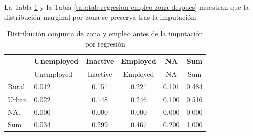 \documentclass[
  spanish,
  12pt,
]{book}
\newenvironment{Shaded}{\begin{snugshade}}{\end{snugshade}}
\newcommand{\AttributeTok}[1]{\textcolor[rgb]{0.13,0.29,0.53}{#1}}
\newcommand{\FunctionTok}[1]{\textcolor[rgb]{0.13,0.29,0.53}{\textbf{#1}}}
\newcommand{\NormalTok}[1]{#1}
\newcommand{\SpecialCharTok}[1]{\textcolor[rgb]{0.81,0.36,0.00}{\textbf{#1}}}
\newcommand{\StringTok}[1]{\textcolor[rgb]{0.31,0.60,0.02}{#1}}
\begin{document}
La Tabla \ref{tab:tab-regresion-empleo-zona-antes} y la Tabla \ref{tab:tab-regresion-empleo-zona-despues} muestran que la distribución marginal por zona se preserva tras la imputación:

\begin{Shaded}
\end{Shaded}

\begin{longtable}[]{@{}llcccc@{}}
\caption{\label{tab:tab-regresion-empleo-zona-antes}Distribución conjunta de zona y empleo antes de la imputación por regresión}\tabularnewline
\toprule\noalign{}
& Unemployed & Inactive & Employed & NA & Sum \\
\midrule\noalign{}
\endfirsthead
\toprule\noalign{}
& Unemployed & Inactive & Employed & NA & Sum \\
\midrule\noalign{}
\endhead
\bottomrule\noalign{}
\endlastfoot
Rural & 0.012 & 0.151 & 0.221 & 0.101 & 0.484 \\
Urban & 0.022 & 0.148 & 0.246 & 0.100 & 0.516 \\
NA. & 0.000 & 0.000 & 0.000 & 0.000 & 0.000 \\
Sum & 0.034 & 0.299 & 0.467 & 0.200 & 1.000 \\
\end{longtable}

\begin{Shaded}
\end{Shaded}
\end{document}
